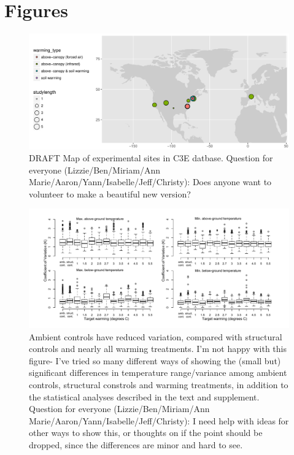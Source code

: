 \documentclass{article}
\begin{document}
\section* {Figures}
\begin{figure}[p]
\centering
 \includegraphics{../Analyses/maps/expsites.pdf}  
\caption{DRAFT Map of experimental sites in C3E datbase. Question for everyone (Lizzie/Ben/Miriam/Ann Marie/Aaron/Yann/Isabelle/Jeff/Christy): Does anyone want to volunteer to make a beautiful new version?} 
\label{fig:map}
\end{figure}
 \begin{figure}[p]
 \centering
 \includegraphics{../Analyses/figures/DRAFT_CVBytreatment.pdf} 
 \caption{Ambient controls have reduced variation, compared with structural controls and nearly all warming treatments. I'm not happy with this figure- I've tried so many different ways of showing the (small but) significant differences in temperature range/variance among ambient controls, structural constrols and warming treatments, in addition to the statistical analyses described in the text and supplement. Question for everyone (Lizzie/Ben/Miriam/Ann Marie/Aaron/Yann/Isabelle/Jeff/Christy): I need help with ideas for other ways to show this, or thoughts on if the point should be dropped, since the differences are minor and hard to see.} 
 \label{fig:cv}
 \end{figure}
\end{document}
